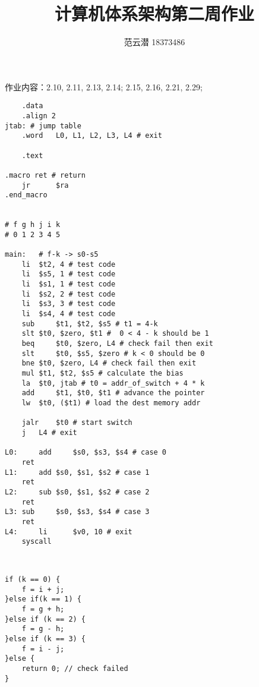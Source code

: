 \documentclass[lang=cn,11pt,a4paper,cite=authoryear]{elegantpaper}
\title{计算机体系架构\quad 第二周作业}
\author{范云潜 18373486}
\institute{微电子学院 184111 班}
\date{\zhtoday}
\begin{document}
\maketitle

作业内容：2.10, 2.11, 2.13, 2.14; 2.15, 2.16, 2.21, 2.29;




\begin{lstlisting}
    .data
	.align 2
jtab: # jump table
	.word	L0, L1, L2, L3, L4 # exit

	.text 

.macro ret # return 
	jr   	$ra
.end_macro 
	

# f g h j i k
# 0 1 2 3 4 5

main:	# f-k -> s0-s5
	li	$t2, 4 # test code 
	li	$s5, 1 # test code 
	li	$s1, 1 # test code 
	li	$s2, 2 # test code 
	li	$s3, 3 # test code 
	li	$s4, 4 # test code 
	sub 	$t1, $t2, $s5 # t1 = 4-k 
	slt	$t0, $zero, $t1	#  0 < 4 - k should be 1
	beq 	$t0, $zero, L4 # check fail then exit
	slt 	$t0, $s5, $zero # k < 0 should be 0 
	bne	$t0, $zero, L4 # check fail then exit
	mul	$t1, $t2, $s5 # calculate the bias 
	la	$t0, jtab # t0 = addr_of_switch + 4 * k
	add 	$t1, $t0, $t1 # advance the pointer
	lw	$t0, ($t1) # load the dest memory addr 
	
	jalr	$t0 # start switch 
	j 	L4 # exit 
	
L0: 	add 	$s0, $s3, $s4 # case 0
	ret 
L1: 	add	$s0, $s1, $s2 # case 1
	ret 
L2: 	sub	$s0, $s1, $s2 # case 2
	ret
L3:	sub 	$s0, $s3, $s4 # case 3
	ret 
L4: 	li      $v0, 10	# exit
	syscall			

	
\end{lstlisting}    



\begin{lstlisting}
if (k == 0) {
    f = i + j;
}else if(k == 1) {
    f = g + h;
}else if (k == 2) {
    f = g - h;
}else if (k == 3) {
    f = i - j;
}else {
    return 0; // check failed
}
\end{lstlisting}

\end{document}
